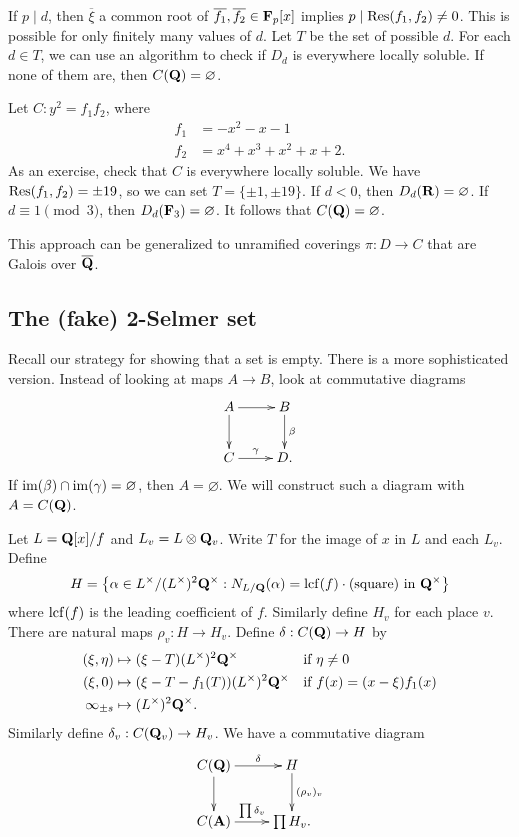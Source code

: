 If $p\mid d$, then $\overline\xi$ a common root of 
$\overline{f_1},\overline{f_2}\in \mathbf{F}_p[x]$ implies 
$p\mid \operatorname{Res}(f_1,f_2)\ne 0$. This is possible for only finitely many 
values of $d$. Let $T$ be the set of possible $d$. For each $d\in T$, we can 
use an algorithm to check if $D_d$ is everywhere locally soluble. If none of 
them are, then $C(\mathbf{Q})=\varnothing$. 

\begin{example}
Let $C:y^2=f_1 f_2$, where 
\begin{align*}
  f_1 &= -x^2-x-1 \\
  f_2 &= x^4 + x^3 + x^2 + x+2 .
\end{align*}
As an exercise, check that $C$ is everywhere locally soluble. We have 
$\operatorname{Res}(f_1,f_2)=\pm 19$, so we can set $T=\{\pm 1,\pm 19\}$. If 
$d<0$, then $D_d(\mathbf{R})=\varnothing$. If $d\equiv 1\pmod 3$, then 
$D_d(\mathbf{F}_3)=\varnothing$. It follows that $C(\mathbf{Q})=\varnothing$. 
\end{example}

This approach can be generalized to unramified coverings $\pi:D\to C$ that are 
Galois over $\overline{\mathbf{Q}}$. 





\subsection{The (fake) 2-Selmer set}

Recall our strategy for showing that a set is empty. There is a more 
sophisticated version. Instead of looking at maps $A\to B$, look at 
commutative diagrams 
\[\xymatrix{
  A \ar[r] \ar[d] 
    & B \ar[d]^-\beta \\
  C \ar[r]^-\gamma 
    & D .
}\]
If $\operatorname{im}(\beta)\cap \operatorname{im}(\gamma)=\varnothing$, then $A=\varnothing$. We 
will construct such a diagram with $A=C(\mathbf{Q})$. 

Let $L=\mathbf{Q}[x]/f$ and $L_v=L\otimes \mathbf{Q}_v$. Write $T$ for the image of $x$ in 
$L$ and each $L_v$. Define 
\[
  H = \left\{\alpha\in L^\times/(L^\times)^2 \mathbf{Q}^\times:N_{L/\mathbf{Q}}(\alpha) = \operatorname{lcf}(f)\cdot (\text{square})\text{ in }\mathbf{Q}^\times\right\}
\]
where $\operatorname{lcf}(f)$ is the leading coefficient of $f$. Similarly 
define $H_v$ for each place $v$. There are natural maps $\rho_v:H\to H_v$. 
Define $\delta:C(\mathbf{Q}) \to H$ by 
\begin{align*}
  (\xi,\eta) &\mapsto (\xi-T) (L^\times)^2 \mathbf{Q}^\times && \text{if }\eta\ne 0 \\
  (\xi,0) &\mapsto (\xi-T-f_1(T))(L^\times)^2 \mathbf{Q}^\times && \text{if }f(x)=(x-\xi)f_1(x) \\
  \infty_{\pm s} &\mapsto (L^\times)^2 \mathbf{Q}^\times .
\end{align*} 
Similarly define $\delta_v:C(\mathbf{Q}_v)\to H_v$. We have a commutative diagram 
\[\xymatrix{
  C(\dQ) \ar[r]^-\delta \ar[d] 
    & H \ar[d]^-{(\rho_v)_v} \\
  C(\dA) \ar[r]^-{\prod \delta_v} 
    & \prod H_v .
}\]

